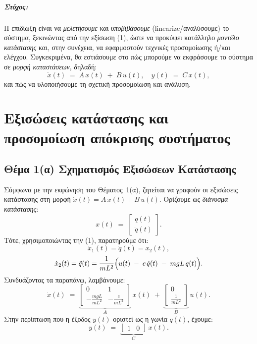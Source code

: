 \documentclass[a4paper,12pt]{report}
\newcommand{\en}{\selectlanguage{english}}
\newcommand{\gr}{\selectlanguage{greek}}
\begin{document}
\paragraph{Στόχος:}
Η επιδίωξη είναι να \emph{μελετήσουμε} και \emph{υποβιβάσουμε} \en(linearize\gr/αναλύσουμε)
το σύστημα, ξεκινώντας από την εξίσωση (1), ώστε να προκύψει κατάλληλο \emph{μοντέλο 
κατάστασης} και, στην συνέχεια, να εφαρμοστούν τεχνικές προσομοίωσης ή/και ελέγχου. 
Συγκεκριμένα, θα εστιάσουμε στο πώς μπορούμε να εκφράσουμε το σύστημα σε 
\emph{μορφή καταστάσεων}, δηλαδή:
\[
\dot{x}(t) \;=\; A\,x(t)\;+\;B\,u(t),
\quad
y(t) \;=\;C\,x(t),
\]
και πώς να υλοποιήσουμε τη σχετική προσομοίωση και ανάλυση.

\bigskip

\chapter{Εξισώσεις κατάστασης και προσομοίωση απόκρισης συστήματος}

\section{Θέμα 1(α) Σχηματισμός Εξισώσεων Κατάστασης}

Σύμφωνα με την εκφώνηση του Θέματος~1(α), ζητείται να γραφούν οι εξισώσεις κατάστασης 
στη μορφή $\dot{x}(t) = A\,x(t) + B\,u(t)$. Ορίζουμε ως \emph{διάνυσμα κατάστασης}:
\[
x(t) 
\;=\;
\begin{bmatrix}
q(t) \\
\dot{q}(t)
\end{bmatrix}.
\]
Τότε, χρησιμοποιώντας την (1), παρατηρούμε ότι:
\[
\dot{x}_1(t) = \dot{q}(t) = x_2(t),
\]
\[
\dot{x}_2(t) 
= \ddot{q}(t)
= \frac{1}{m L^2}\Bigl(u(t) \;-\; c\,\dot{q}(t)\;-\;m g L\,q(t)\Bigr).
\]
Συνδυάζοντας τα παραπάνω, λαμβάνουμε:
\[
\dot{x}(t)
\;=\;
\underbrace{\begin{bmatrix}
0 & 1\\
-\frac{m g L}{m L^2} & -\frac{c}{m L^2}
\end{bmatrix}}_{A}
\,x(t)
\;+\;
\underbrace{\begin{bmatrix}
0 \\[2pt]
\frac{1}{m L^2}
\end{bmatrix}}_{B}
\,u(t).
\]
Στην περίπτωση που η έξοδος $y(t)$ οριστεί ως η γωνία $q(t)$, έχουμε:
\[
y(t) 
\;=\;
\underbrace{\begin{bmatrix} 1 & 0 \end{bmatrix}}_{C}\,x(t).
\]
\end{document}
